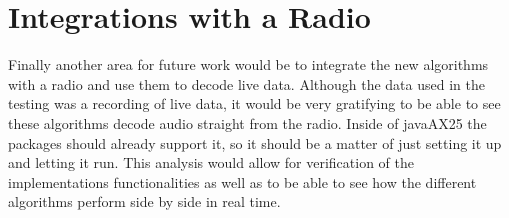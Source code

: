 \section{Integrations with a Radio}
Finally another area for future work would be to integrate the new algorithms with a radio and use them to decode live data. Although the data used in the testing was a recording of live data, it would be very gratifying to be able to see these algorithms decode audio straight from the radio. Inside of javaAX25 the packages should already support it, so it should be a matter of just setting it up and letting it run. This analysis would allow for verification of the implementations functionalities as well as to be able to see how the different algorithms perform side by side in real time.

